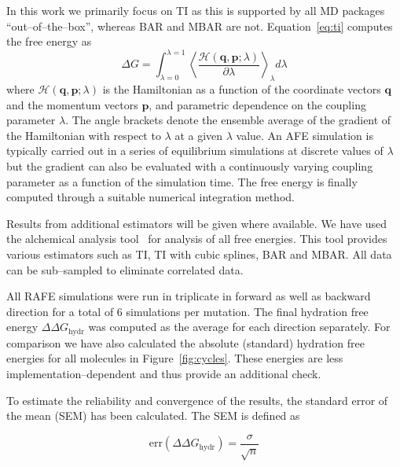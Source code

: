 \documentclass[journal=jctcce,manuscript=article]{achemso}
\renewcommand{\vec}[1]{\mathbf{#1}}
\begin{document}
In this work we primarily focus on TI as this is supported by all MD
packages ``out--of--the--box'', whereas BAR and MBAR are not.
Equation~\ref{eq:ti} computes the free energy as
\begin{equation}\label{eq:ti}
	\Delta G = \int_{\lambda=0}^{\lambda=1}
	\left\langle 
	\frac{\mathscr{H}(\vec{q},\vec{p};\lambda)}{\partial\lambda}\right\rangle_\lambda
	 d\lambda
\end{equation}
where $\mathscr{H}(\vec{q},\vec{p};\lambda)$ is the Hamiltonian as a function 
of the coordinate vectors $\vec{q}$ and the momentum vectors $\vec{p}$, and 
parametric dependence on the coupling parameter $\lambda$.  The angle brackets 
denote the ensemble average of the gradient of the Hamiltonian with respect to 
$\lambda$ at a given $\lambda$ value.  An AFE simulation is typically carried 
out in a series of equilibrium simulations at discrete values of $\lambda$ but 
the gradient can also be evaluated with a continuously varying coupling 
parameter as a function of the simulation time.  The free energy is finally 
computed through a suitable numerical integration method.

Results from additional estimators
will be given where available.  We have used the alchemical analysis
tool~\cite{klimovich_guidelines_2015} for analysis of all free energies.  This
tool provides various estimators such as TI, TI with cubic splines,
BAR and MBAR.  All data can be sub--sampled to eliminate correlated
data.

All RAFE simulations were run in triplicate in forward as well as
backward direction for a total of 6 simulations per mutation.  The
final hydration free energy $\Delta\Delta G_{\mathrm{hydr}}$ was
computed as the average for each direction separately.  For comparison we have 
also calculated the absolute (standard) hydration free energies for all
molecules in Figure~\ref{fig:cycles}.  These energies are less 
implementation--dependent and thus provide an additional check.

To estimate the reliability and convergence of the results, the
standard error of the mean (SEM) has been calculated.  The SEM is
defined as

\begin{equation}
  \label{eq:sem}
  \mathrm{err}(\Delta\Delta G_{\mathrm{hydr}}) = \frac{\sigma}{\sqrt{n}}
\end{equation}
\end{document}
